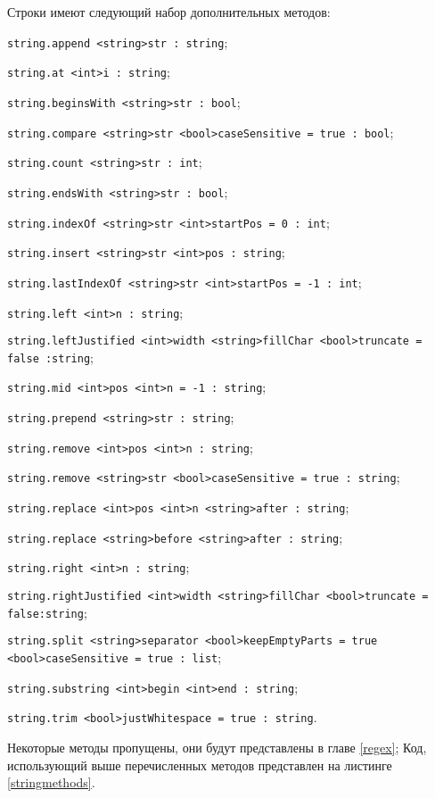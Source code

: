 Строки имеют следующий набор дополнительных методов:
\begin{icItems}
\item
	\lstinline|string.append <string>str : string|;
\item
	\lstinline|string.at <int>i : string|;
\item
	\lstinline|string.beginsWith <string>str : bool|;
\item
	\lstinline|string.compare <string>str <bool>caseSensitive = true : bool|;
\item
	\lstinline|string.count <string>str : int|;
\item
	\lstinline|string.endsWith <string>str : bool|;
\item
	\lstinline|string.indexOf <string>str <int>startPos = 0 : int|;
\item
	\lstinline|string.insert <string>str <int>pos : string|;
\item
	\lstinline|string.lastIndexOf <string>str <int>startPos = -1 : int|;
\item
	\lstinline|string.left <int>n : string|;
\item
	\lstinline|string.leftJustified <int>width <string>fillChar <bool>truncate = false :string|;
\item
	\lstinline|string.mid <int>pos <int>n = -1 : string|;
\item
	\lstinline|string.prepend <string>str : string|;
\item
	\lstinline|string.remove <int>pos <int>n : string|;
\item
	\lstinline|string.remove <string>str <bool>caseSensitive = true : string|;
\item
	\lstinline|string.replace <int>pos <int>n <string>after : string|;
\item
	\lstinline|string.replace <string>before <string>after : string|;
\item
	\lstinline|string.right <int>n : string|;
\item
	\lstinline|string.rightJustified <int>width <string>fillChar <bool>truncate = false:string|;
\item
	\lstinline|string.split <string>separator <bool>keepEmptyParts = true <bool>caseSensitive = true : list|;
\item
	\lstinline|string.substring <int>begin <int>end : string|;
\item
	\lstinline|string.trim <bool>justWhitespace = true : string|.
\end{icItems}

Некоторые методы пропущены, они будут представлены в главе \ref{regex}; Код, использующий выше перечисленных методов представлен на листинге \ref{stringmethods}.

